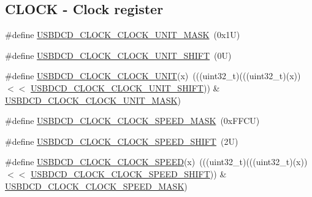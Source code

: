 \subsection*{C\+L\+O\+CK -\/ Clock register}
\begin{DoxyCompactItemize}
\item 
\#define \mbox{\hyperlink{group___u_s_b_d_c_d___register___masks_ga7c8eace6dde39098426fe04c6b32bf92}{U\+S\+B\+D\+C\+D\+\_\+\+C\+L\+O\+C\+K\+\_\+\+C\+L\+O\+C\+K\+\_\+\+U\+N\+I\+T\+\_\+\+M\+A\+SK}}~(0x1\+U)
\item 
\#define \mbox{\hyperlink{group___u_s_b_d_c_d___register___masks_gae3126a9608c08fe560b91f7b742bb98a}{U\+S\+B\+D\+C\+D\+\_\+\+C\+L\+O\+C\+K\+\_\+\+C\+L\+O\+C\+K\+\_\+\+U\+N\+I\+T\+\_\+\+S\+H\+I\+FT}}~(0\+U)
\item 
\#define \mbox{\hyperlink{group___u_s_b_d_c_d___register___masks_ga8a6606e128a4febd4313349565067e52}{U\+S\+B\+D\+C\+D\+\_\+\+C\+L\+O\+C\+K\+\_\+\+C\+L\+O\+C\+K\+\_\+\+U\+N\+IT}}(x)~(((uint32\+\_\+t)(((uint32\+\_\+t)(x)) $<$$<$ \mbox{\hyperlink{group___u_s_b_d_c_d___register___masks_gae3126a9608c08fe560b91f7b742bb98a}{U\+S\+B\+D\+C\+D\+\_\+\+C\+L\+O\+C\+K\+\_\+\+C\+L\+O\+C\+K\+\_\+\+U\+N\+I\+T\+\_\+\+S\+H\+I\+FT}})) \& \mbox{\hyperlink{group___u_s_b_d_c_d___register___masks_ga7c8eace6dde39098426fe04c6b32bf92}{U\+S\+B\+D\+C\+D\+\_\+\+C\+L\+O\+C\+K\+\_\+\+C\+L\+O\+C\+K\+\_\+\+U\+N\+I\+T\+\_\+\+M\+A\+SK}})
\item 
\#define \mbox{\hyperlink{group___u_s_b_d_c_d___register___masks_gaf53eaecf9a4de0251c8906350ac989ae}{U\+S\+B\+D\+C\+D\+\_\+\+C\+L\+O\+C\+K\+\_\+\+C\+L\+O\+C\+K\+\_\+\+S\+P\+E\+E\+D\+\_\+\+M\+A\+SK}}~(0x\+F\+F\+C\+U)
\item 
\#define \mbox{\hyperlink{group___u_s_b_d_c_d___register___masks_gaa1667808247c5b8355c58b93a4e80c8a}{U\+S\+B\+D\+C\+D\+\_\+\+C\+L\+O\+C\+K\+\_\+\+C\+L\+O\+C\+K\+\_\+\+S\+P\+E\+E\+D\+\_\+\+S\+H\+I\+FT}}~(2\+U)
\item 
\#define \mbox{\hyperlink{group___u_s_b_d_c_d___register___masks_gadaafc909e148543c71cfd927b757be98}{U\+S\+B\+D\+C\+D\+\_\+\+C\+L\+O\+C\+K\+\_\+\+C\+L\+O\+C\+K\+\_\+\+S\+P\+E\+ED}}(x)~(((uint32\+\_\+t)(((uint32\+\_\+t)(x)) $<$$<$ \mbox{\hyperlink{group___u_s_b_d_c_d___register___masks_gaa1667808247c5b8355c58b93a4e80c8a}{U\+S\+B\+D\+C\+D\+\_\+\+C\+L\+O\+C\+K\+\_\+\+C\+L\+O\+C\+K\+\_\+\+S\+P\+E\+E\+D\+\_\+\+S\+H\+I\+FT}})) \& \mbox{\hyperlink{group___u_s_b_d_c_d___register___masks_gaf53eaecf9a4de0251c8906350ac989ae}{U\+S\+B\+D\+C\+D\+\_\+\+C\+L\+O\+C\+K\+\_\+\+C\+L\+O\+C\+K\+\_\+\+S\+P\+E\+E\+D\+\_\+\+M\+A\+SK}})
\end{DoxyCompactItemize}
